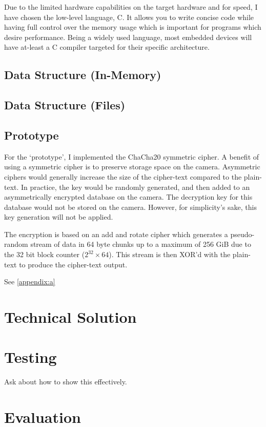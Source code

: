\documentclass{report}
\begin{document}
Due to the limited hardware capabilities on the target hardware and for speed, I have chosen the low-level language, C. It allows you to write concise code while having full control over the memory usage which is important for programs which desire performance. Being a widely used language, most embedded devices will have at-least a C compiler targeted for their specific architecture.

\section{Data Structure (In-Memory)}

\section{Data Structure (Files)}

\section{Prototype}

For the `prototype', I implemented the ChaCha20 symmetric cipher. A benefit of using a symmetric cipher is to preserve storage space on the camera. Asymmetric ciphers would generally increase the size of the cipher-text compared to the plain-text. In practice, the key would be randomly generated, and then added to an asymmetrically encrypted database on the camera. The decryption key for this database would not be stored on the camera. However, for simplicity's sake, this key generation will not be applied.

The encryption is based on an add and rotate cipher which generates a pseudo-random stream of data in 64 byte chunks up to a maximum of 256 GiB due to the 32 bit block counter (${2^{32}}\times64$). This stream is then XOR'd with the plain-text to produce the cipher-text output.

See \ref{appendix:a}

\chapter{Technical Solution}

\chapter{Testing}

Ask about how to show this effectively.

\chapter{Evaluation}
\end{document}
